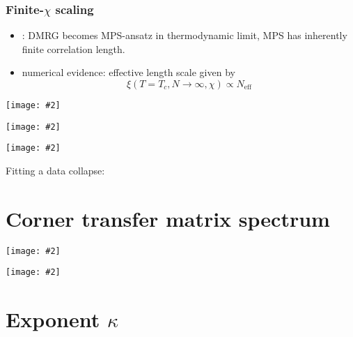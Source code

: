\documentclass{beamer}
\newcommand{\includeproper}[2][0.8]{\texttt{[image: \#2]}}
\begin{document}
\begin{frame}
  \frametitle{Finite-$\chi$ scaling}
  \begin{itemize}

    \item \cite{ostlund1995thermodynamic}:
    DMRG becomes MPS-ansatz in thermodynamic limit, MPS has inherently finite correlation length.
    \item \cite{nishino1996numerical} numerical evidence: effective length scale given by
    \begin{equation*}
      \xi(T = T_c, N \to \infty, \chi) \propto N_{\text{eff}}
      \end{equation*}

  \end{itemize}
\end{frame}

\begin{frame}
  \includeproper[]{m_vs_correlation_length_power_law_fit_Tcrit_chi8-112_tol1e-7.pdf}
\end{frame}

\begin{frame}
  \includeproper[]{order_parameter_vs_N_power_law_fit_N5-4000.pdf}
\end{frame}

\begin{frame}
  \includeproper[0.7]{data_collapse_chi24-60_bounding_box_q2.pdf}

  Fitting a data collapse: \cite{bhattacharjee2001measure}
\end{frame}

\section{Corner transfer matrix spectrum}

\begin{frame}
  \includeproper[]{spectrum_ctm_spin_up_boundary_N1000.pdf}
\end{frame}

\begin{frame}
  \includeproper[]{spectrum_ctm_symmetric_boundary_N1000.pdf}
\end{frame}


\section{Exponent $\kappa$}
\end{document}
